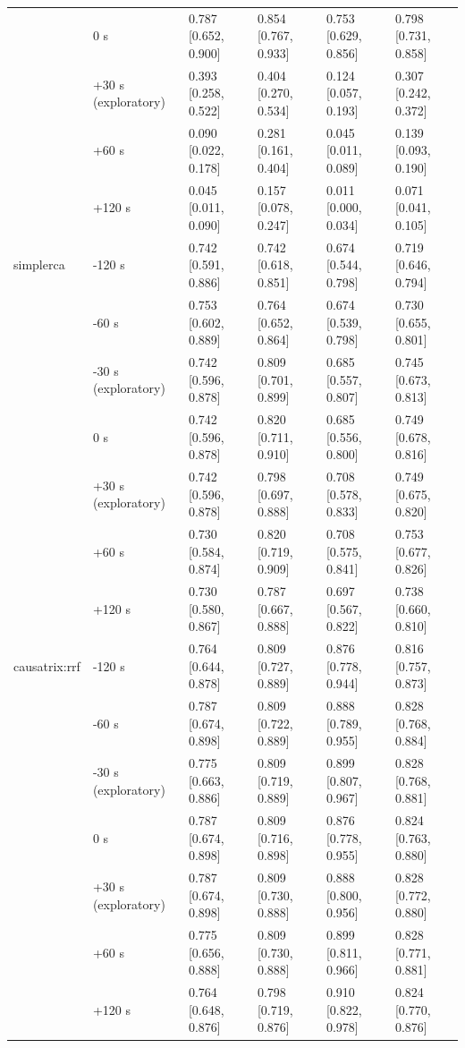 \begin{table}[t]
\begin{tabular}{@{}llllll@{}}
 & 0 s & 0.787 [0.652, 0.900] & 0.854 [0.767, 0.933] & 0.753 [0.629, 0.856] & 0.798 [0.731, 0.858] \\
 & +30 s (exploratory) & 0.393 [0.258, 0.522] & 0.404 [0.270, 0.534] & 0.124 [0.057, 0.193] & 0.307 [0.242, 0.372] \\
 & +60 s & 0.090 [0.022, 0.178] & 0.281 [0.161, 0.404] & 0.045 [0.011, 0.089] & 0.139 [0.093, 0.190] \\
 & +120 s & 0.045 [0.011, 0.090] & 0.157 [0.078, 0.247] & 0.011 [0.000, 0.034] & 0.071 [0.041, 0.105] \\
simplerca & -120 s & 0.742 [0.591, 0.886] & 0.742 [0.618, 0.851] & 0.674 [0.544, 0.798] & 0.719 [0.646, 0.794] \\
 & -60 s & 0.753 [0.602, 0.889] & 0.764 [0.652, 0.864] & 0.674 [0.539, 0.798] & 0.730 [0.655, 0.801] \\
 & -30 s (exploratory) & 0.742 [0.596, 0.878] & 0.809 [0.701, 0.899] & 0.685 [0.557, 0.807] & 0.745 [0.673, 0.813] \\
 & 0 s & 0.742 [0.596, 0.878] & 0.820 [0.711, 0.910] & 0.685 [0.556, 0.800] & 0.749 [0.678, 0.816] \\
 & +30 s (exploratory) & 0.742 [0.596, 0.878] & 0.798 [0.697, 0.888] & 0.708 [0.578, 0.833] & 0.749 [0.675, 0.820] \\
 & +60 s & 0.730 [0.584, 0.874] & 0.820 [0.719, 0.909] & 0.708 [0.575, 0.841] & 0.753 [0.677, 0.826] \\
 & +120 s & 0.730 [0.580, 0.867] & 0.787 [0.667, 0.888] & 0.697 [0.567, 0.822] & 0.738 [0.660, 0.810] \\
causatrix:rrf & -120 s & 0.764 [0.644, 0.878] & 0.809 [0.727, 0.889] & 0.876 [0.778, 0.944] & 0.816 [0.757, 0.873] \\
 & -60 s & 0.787 [0.674, 0.898] & 0.809 [0.722, 0.889] & 0.888 [0.789, 0.955] & 0.828 [0.768, 0.884] \\
 & -30 s (exploratory) & 0.775 [0.663, 0.886] & 0.809 [0.719, 0.889] & 0.899 [0.807, 0.967] & 0.828 [0.768, 0.881] \\
 & 0 s & 0.787 [0.674, 0.898] & 0.809 [0.716, 0.898] & 0.876 [0.778, 0.955] & 0.824 [0.763, 0.880] \\
 & +30 s (exploratory) & 0.787 [0.674, 0.898] & 0.809 [0.730, 0.888] & 0.888 [0.800, 0.956] & 0.828 [0.772, 0.880] \\
 & +60 s & 0.775 [0.656, 0.888] & 0.809 [0.730, 0.888] & 0.899 [0.811, 0.966] & 0.828 [0.771, 0.881] \\
 & +120 s & 0.764 [0.648, 0.876] & 0.798 [0.719, 0.876] & 0.910 [0.822, 0.978] & 0.824 [0.770, 0.876] \\

\end{tabular}
\end{table}
